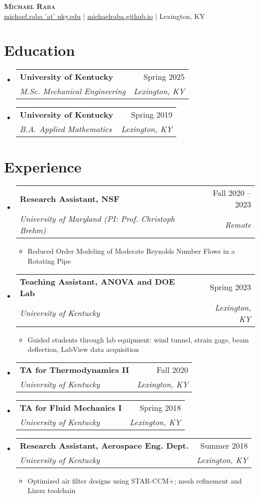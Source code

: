 \documentclass[letterpaper,11pt]{article}
\makeatletter
\newcommand{\resumeItem}[1]{
  \item\small{
    {#1 \vspace{-2pt}}
  }
}
\newcommand{\resumeSubheading}[4]{
  \vspace{-2pt}\item
    \begin{tabular*}{0.97\textwidth}[t]{l@{\extracolsep{\fill}}r}
      \textbf{#1} & #2 \\
      \textit{\small#3} & \textit{\small #4} \\
    \end{tabular*}\vspace{-7pt}
}
\newcommand{\resumeSubHeadingListStart}{\begin{itemize}[leftmargin=0.15in, label={}]}
\newcommand{\resumeSubHeadingListEnd}{\end{itemize}}
\newcommand{\resumeItemListStart}{\begin{itemize}}
\newcommand{\resumeItemListEnd}{\end{itemize}\vspace{-5pt}}
\makeatother
\begin{document}
\begin{center}
    \textbf{\Huge \scshape Michael Raba} \\
    \href{mailto:michael.raba 'at' uky.edu}{michael.raba 'at' uky.edu} $|$
    \href{https://michaelraba.github.io}{michaelraba.github.io} $|$
    Lexington, KY
\end{center}

\section{Education}
  \resumeSubHeadingListStart
    \resumeSubheading
      {University of Kentucky}{Spring 2025}
      {M.Sc. Mechanical Engineering}{Lexington, KY}
    \resumeSubheading
      {University of Kentucky}{Spring 2019}
      {B.A. Applied Mathematics}{Lexington, KY}
  \resumeSubHeadingListEnd

\section{Experience}
  \resumeSubHeadingListStart
    \resumeSubheading
      {Research Assistant, NSF}{Fall 2020 -- 2023}
      {University of Maryland (PI: Prof. Christoph Brehm)}{Remote}
      \resumeItemListStart
        \resumeItem{Reduced Order Modeling of Moderate Reynolds Number Flows in a Rotating Pipe}
      \resumeItemListEnd

    \resumeSubheading
      {Teaching Assistant, ANOVA and DOE Lab}{Spring 2023}
      {University of Kentucky}{Lexington, KY}
      \resumeItemListStart
        \resumeItem{Guided students through lab equipment: wind tunnel, strain gage, beam deflection, LabView data acquisition}
      \resumeItemListEnd

    \resumeSubheading
      {TA for Thermodynamics II}{Fall 2020}
      {University of Kentucky}{Lexington, KY}

    \resumeSubheading
      {TA for Fluid Mechanics I}{Spring 2018}
      {University of Kentucky}{Lexington, KY}

    \resumeSubheading
      {Research Assistant, Aerospace Eng. Dept.}{Summer 2018}
      {University of Kentucky}{Lexington, KY}
      \resumeItemListStart
        \resumeItem{Optimized air filter designs using STAR-CCM+; mesh refinement and Linux toolchain}
      \resumeItemListEnd
  \resumeSubHeadingListEnd

\end{document}
